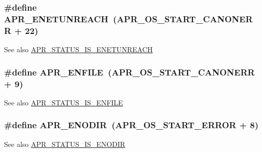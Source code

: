 \subsubsection[{\texorpdfstring{A\+P\+R\+\_\+\+E\+N\+E\+T\+U\+N\+R\+E\+A\+CH}{APR_ENETUNREACH}}]{\setlength{\rightskip}{0pt plus 5cm}\#define A\+P\+R\+\_\+\+E\+N\+E\+T\+U\+N\+R\+E\+A\+CH~({\bf A\+P\+R\+\_\+\+O\+S\+\_\+\+S\+T\+A\+R\+T\+\_\+\+C\+A\+N\+O\+N\+E\+RR} + 22)}\hypertarget{group__APR__Error_gab9b7124a88817d1b69cdef059f7dc689}{}\label{group__APR__Error_gab9b7124a88817d1b69cdef059f7dc689}
\begin{DoxySeeAlso}{See also}
\hyperlink{group__APR__STATUS__IS_ga19911958b3dd62559fb6c245ec579c27}{A\+P\+R\+\_\+\+S\+T\+A\+T\+U\+S\+\_\+\+I\+S\+\_\+\+E\+N\+E\+T\+U\+N\+R\+E\+A\+CH} 
\end{DoxySeeAlso}
\subsubsection[{\texorpdfstring{A\+P\+R\+\_\+\+E\+N\+F\+I\+LE}{APR_ENFILE}}]{\setlength{\rightskip}{0pt plus 5cm}\#define A\+P\+R\+\_\+\+E\+N\+F\+I\+LE~({\bf A\+P\+R\+\_\+\+O\+S\+\_\+\+S\+T\+A\+R\+T\+\_\+\+C\+A\+N\+O\+N\+E\+RR} + 9)}\hypertarget{group__APR__Error_gaf46f59147b00c2c87d76b9eb75674456}{}\label{group__APR__Error_gaf46f59147b00c2c87d76b9eb75674456}
\begin{DoxySeeAlso}{See also}
\hyperlink{group__APR__STATUS__IS_ga4274ec4c91423ae54ab8a1d53991fb76}{A\+P\+R\+\_\+\+S\+T\+A\+T\+U\+S\+\_\+\+I\+S\+\_\+\+E\+N\+F\+I\+LE} 
\end{DoxySeeAlso}
\subsubsection[{\texorpdfstring{A\+P\+R\+\_\+\+E\+N\+O\+D\+IR}{APR_ENODIR}}]{\setlength{\rightskip}{0pt plus 5cm}\#define A\+P\+R\+\_\+\+E\+N\+O\+D\+IR~({\bf A\+P\+R\+\_\+\+O\+S\+\_\+\+S\+T\+A\+R\+T\+\_\+\+E\+R\+R\+OR} + 8)}\hypertarget{group__APR__Error_ga9a8077e85b6241c1e91b69548395fc09}{}\label{group__APR__Error_ga9a8077e85b6241c1e91b69548395fc09}
\begin{DoxySeeAlso}{See also}
\hyperlink{group__APR__STATUS__IS_ga666c0bcfb97d26df7e7e360041d93fc6}{A\+P\+R\+\_\+\+S\+T\+A\+T\+U\+S\+\_\+\+I\+S\+\_\+\+E\+N\+O\+D\+IR} 
\end{DoxySeeAlso}

